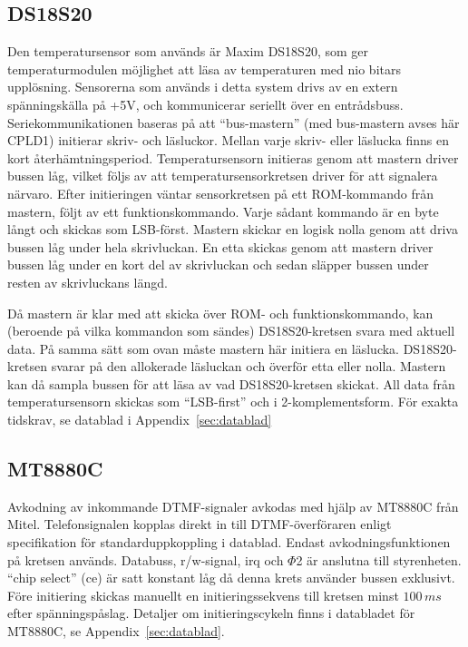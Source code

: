 \documentclass[a4paper,11pt]{article}
\begin{document}
	\subsection{DS18S20}
	\label{DS18S20}
		Den temperatursensor som används är Maxim DS18S20, som ger temperaturmodulen möjlighet att läsa av temperaturen
		med nio bitars upplösning. Sensorerna som används i detta system drivs av en extern spänningskälla på +5V,
		och kommunicerar seriellt över en entrådsbuss. Seriekommunikationen baseras på att ``bus-mastern'' (med bus-mastern avses här CPLD1) initierar skriv-
		och läsluckor. Mellan varje skriv- eller läslucka finns en kort återhämtningsperiod. Temperatursensorn initieras genom att mastern
		driver bussen låg, vilket följs av att temperatursensorkretsen driver för att signalera närvaro.
		Efter initieringen väntar sensorkretsen på ett ROM-kommando från mastern,
		följt av ett funktionskommando. Varje sådant kommando är en byte långt och skickas som LSB-först. Mastern skickar
		en logisk nolla genom att driva bussen låg under hela skrivluckan. En etta skickas genom att mastern driver bussen låg
		under en kort del av skrivluckan och sedan släpper bussen under resten av skrivluckans längd. 

		Då mastern är klar med att skicka över ROM- och funktionskommando, kan (beroende på vilka kommandon som sändes) DS18S20-kretsen
		svara med aktuell data. På samma sätt som ovan måste mastern här initiera en läslucka. 
		DS18S20-kretsen svarar på den allokerade läsluckan och överför etta eller nolla. Mastern kan då sampla bussen för att läsa av vad DS18S20-kretsen skickat. All data från
		temperatursensorn skickas som ``LSB-first'' och i 2-komplementsform. För exakta tidskrav, se datablad i Appendix~\ref{sec:datablad}

	\subsection{MT8880C}
	\label{MT8880C}
		Avkodning av inkommande DTMF-signaler avkodas med hjälp av MT8880C från Mitel. 
		Telefonsignalen kopplas direkt in till DTMF-överföraren enligt specifikation för standarduppkoppling i datablad. Endast avkodningsfunktionen på 		kretsen används. Databuss, r/w-signal, irq och $\Phi$2 är anslutna till styrenheten. 
		``chip select'' (ce) är satt konstant låg då denna krets använder bussen exklusivt. 
Före initiering skickas manuellt en initieringssekvens till kretsen minst $100 \, m s$ efter spänningspåslag. Detaljer om initieringscykeln finns i databladet för MT8880C, se Appendix~\ref{sec:datablad}.
\end{document}
